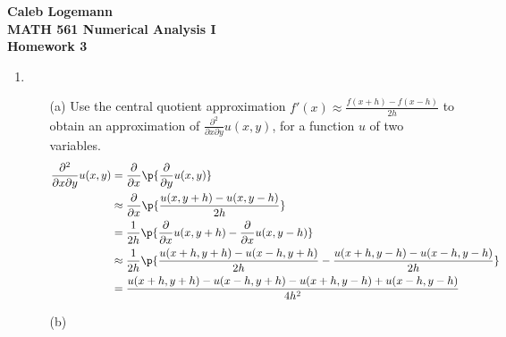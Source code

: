 \documentclass[11pt]{article}
\begin{document}
\noindent \textbf{\Large{Caleb Logemann \\
MATH 561 Numerical Analysis I \\
Homework 3
}}

\begin{enumerate}
    \item %
    \begin{enumerate}
        \item[(a)] Use the central quotient approximation $f'(x) \approx
            \frac{f(x + h) - f(x - h)}{2h}$ to obtain an approximation of
            $\frac{\partial^2}{\partial x \partial y} u(x,y)$, for a function
            $u$ of two variables.
            \begin{align*}
                \frac{\partial^2}{\partial x \partial y} u(x,y) &=
                    \frac{\partial}{\partial x} \p{\frac{\partial}{\partial y} u(x,y)} \\
                &\approx \frac{\partial}{\partial x} \p{\frac{u(x,y + h) - u(x,y - h)}{2h}} \\
                &= \frac{1}{2h} \p{\frac{\partial}{\partial x} u(x,y+h) -
                    \frac{\partial}{\partial x} u(x,y-h)} \\
                &\approx \frac{1}{2h} \p{\frac{u(x+h, y+h) - u(x-h, y+h)}{2h} -
                    \frac{u(x+h, y-h) - u(x-h, y-h)}{2h}} \\
                &= \frac{u(x+h, y+h) - u(x-h, y+h) - u(x+h, y-h) + u(x-h, y-h)}{4h^2} \\
            \end{align*}

        \item[(b)]


\end{enumerate}
\end{enumerate}
\end{document}
